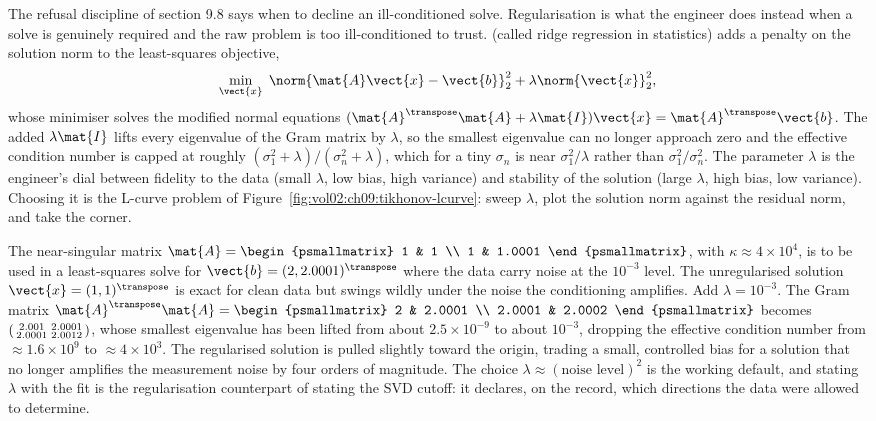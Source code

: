 The refusal discipline of section 9.8 says when to decline an
ill-conditioned solve. Regularisation is what the engineer does instead
when a solve is genuinely required and the raw problem is too
ill-conditioned to trust.  (called
ridge regression in statistics) adds a penalty on the solution norm to
the least-squares objective,
\[
\min_{\vect{x}} \; \norm{\mat{A}\vect{x} - \vect{b}}_{2}^{2} +
\lambda\norm{\vect{x}}_{2}^{2},
\]
whose minimiser solves the modified normal equations $(\mat{A}^{
\transpose}\mat{A} + \lambda\mat{I})\vect{x} = \mat{A}^{\transpose}
\vect{b}$. The added $\lambda\mat{I}$ lifts every eigenvalue of the Gram
matrix by $\lambda$, so the smallest eigenvalue can no longer approach
zero and the effective condition number is capped at roughly
$(\sigma_{1}^{2} + \lambda)/(\sigma_{n}^{2} + \lambda)$, which for a
tiny $\sigma_{n}$ is near $\sigma_{1}^{2}/\lambda$ rather than
$\sigma_{1}^{2}/\sigma_{n}^{2}$. The parameter $\lambda$ is the
engineer's dial between fidelity to the data (small $\lambda$, low bias,
high variance) and stability of the solution (large $\lambda$, high
bias, low variance). Choosing it is the L-curve problem of
Figure~\ref{fig:vol02:ch09:tikhonov-lcurve}: sweep $\lambda$, plot the
solution norm against the residual norm, and take the corner.



\begin{example}
The near-singular matrix $\mat{A} = \begin{psmallmatrix} 1 & 1 \\ 1 &
1.0001 \end{psmallmatrix}$, with $\kappa \approx 4 \times 10^{4}$, is to
be used in a least-squares solve for $\vect{b} = (2, 2.0001)^{\transpose}$
where the data carry noise at the $10^{-3}$ level. The unregularised
solution $\vect{x} = (1, 1)^{\transpose}$ is exact for clean data but
swings wildly under the noise the conditioning amplifies. Add
$\lambda = 10^{-3}$. The Gram matrix $\mat{A}^{\transpose}\mat{A} =
\begin{psmallmatrix} 2 & 2.0001 \\ 2.0001 & 2.0002
\end{psmallmatrix}$ becomes $\begin{psmallmatrix} 2.001 & 2.0001 \\
2.0001 & 2.0012 \end{psmallmatrix}$, whose smallest eigenvalue has been
lifted from about $2.5 \times 10^{-9}$ to about $10^{-3}$, dropping the
effective condition number from $\approx 1.6 \times 10^{9}$ to $\approx
4 \times 10^{3}$. The regularised solution is pulled slightly toward
the origin, trading a small, controlled bias for a solution that no
longer amplifies the measurement noise by four orders of magnitude. The
choice $\lambda \approx (\text{noise level})^{2}$ is the working default,
and stating $\lambda$ with the fit is the regularisation counterpart of
stating the SVD cutoff: it declares, on the record, which directions the
data were allowed to determine.
\end{example}

